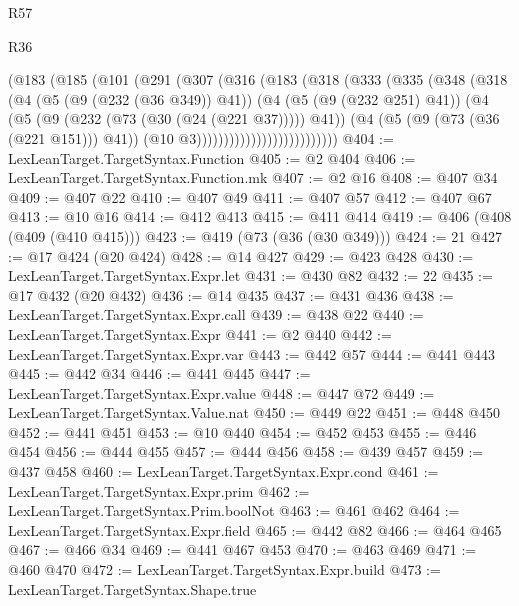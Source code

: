 \begin{lexlean}{R57}
\begin{lexlean}{R36}
\begin{coremodule}
{{{{{{{{{{{{{{{{{{{{{{{{{{{{{{{{{{{{{{{{{{{{{{{{{{{{{{{{{{{{{{{{{{{{{{{{{{{{{{{{{{                      (@183
                        (@185
                          (@101
                            (@291
                              (@307
                                (@316
                                  (@183
                                    (@318
                                      (@333
                                        (@335
                                          (@348
                                            (@318
                                              (@4
                                                (@5 (@9 (@232 (@36 @349)) @41))
                                                (@4
                                                  (@5 (@9 (@232 @251) @41))
                                                  (@4
                                                    (@5
                                                      (@9 (@232 (@73 (@30 (@24 (@221 @37))))) @41))
                                                    (@4
                                                      (@5 (@9 (@73 (@36 (@221 @151))) @41))
                                                      (@10 @3))))))))))))))))))))))))))
@404 := LexLeanTarget.TargetSyntax.Function
@405 := @2 @404
@406 := LexLeanTarget.TargetSyntax.Function.mk
@407 := @2 @16
@408 := @407 @34
@409 := @407 @22
@410 := @407 @49
@411 := @407 @57
@412 := @407 @67
@413 := @10 @16
@414 := @412 @413
@415 := @411 @414
@419 := @406 (@408 (@409 (@410 @415)))
@423 := @419 (@73 (@36 (@30 @349)))
@424 := 21
@427 := @17 @424 (@20 @424)
@428 := @14 @427
@429 := @423 @428
@430 := LexLeanTarget.TargetSyntax.Expr.let
@431 := @430 @82
@432 := 22
@435 := @17 @432 (@20 @432)
@436 := @14 @435
@437 := @431 @436
@438 := LexLeanTarget.TargetSyntax.Expr.call
@439 := @438 @22
@440 := LexLeanTarget.TargetSyntax.Expr
@441 := @2 @440
@442 := LexLeanTarget.TargetSyntax.Expr.var
@443 := @442 @57
@444 := @441 @443
@445 := @442 @34
@446 := @441 @445
@447 := LexLeanTarget.TargetSyntax.Expr.value
@448 := @447 @72
@449 := LexLeanTarget.TargetSyntax.Value.nat
@450 := @449 @22
@451 := @448 @450
@452 := @441 @451
@453 := @10 @440
@454 := @452 @453
@455 := @446 @454
@456 := @444 @455
@457 := @444 @456
@458 := @439 @457
@459 := @437 @458
@460 := LexLeanTarget.TargetSyntax.Expr.cond
@461 := LexLeanTarget.TargetSyntax.Expr.prim
@462 := LexLeanTarget.TargetSyntax.Prim.boolNot
@463 := @461 @462
@464 := LexLeanTarget.TargetSyntax.Expr.field
@465 := @442 @82
@466 := @464 @465
@467 := @466 @34
@469 := @441 @467 @453
@470 := @463 @469
@471 := @460 @470
@472 := LexLeanTarget.TargetSyntax.Expr.build
@473 := LexLeanTarget.TargetSyntax.Shape.true
}}}}}}}}}}}}}}}}}}}}}}}}}}}}}}}}}}}}}}}}}}}}}}}}}}}}}}}}}}}}}}}}}}}}}}}}}}}}}}}}}}
\end{coremodule}
\end{lexlean}
\end{lexlean}
